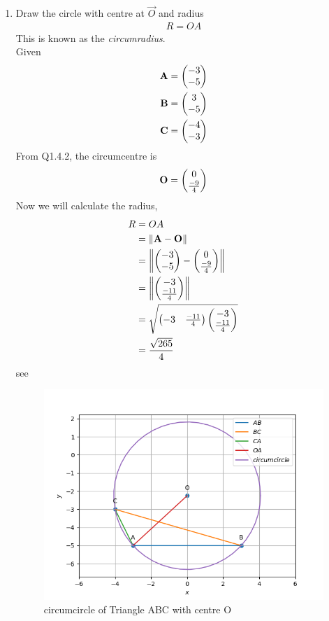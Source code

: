 \documentclass[11pt]{book}
\begin{document}
\begin{enumerate}[label=\thesection.\arabic*.,ref=\thesection.\theenumi]
\item Draw the circle with centre at $\vec{O}$ and radius 
\begin{align}
R = OA
\end{align}
This is known as the {\em circumradius}. \\
\solution
Given
\begin{align}
\mathbf{A} &= \begin{pmatrix}-3\\-5\end{pmatrix}\\
\mathbf{B} &= \begin{pmatrix}3\\-5\end{pmatrix}\\
\mathbf{C} &= \begin{pmatrix}-4\\-3\end{pmatrix}
\end{align}
From Q1.4.2, the circumcentre is
\begin{align}
\mathbf{O} = \begin{pmatrix}0\\ \frac{-9}{4}\end{pmatrix}
\end{align}
Now we will calculate the radius,
\begin{align}
      R &= OA\\
        &= \left\lVert\mathbf{A} - \mathbf{O}\right\rVert\\
        &= \left\lVert\begin{pmatrix}-3\\-5\end{pmatrix} - \begin{pmatrix}0\\ \frac{-9}{4}\end{pmatrix}\right\rVert\\
        &= \left\lVert\begin{pmatrix}-3\\ \frac{-11}{4}\end{pmatrix}\right\rVert\\
        &=\sqrt{\begin{pmatrix}-3 & \frac{-11}{4}\end{pmatrix}\begin{pmatrix}-3 \\ \frac{-11}{4}\end{pmatrix}} \\
        &= \frac{\sqrt{265}}{4}
\end{align}
see 
\begin{figure}[H]
\centering
\includegraphics[width=\columnwidth]{figs/perp_bisect5.png}
\caption{circumcircle of Triangle ABC with centre O}
\label{fig:circumcircle with centre O}	
\end{figure}


\end{enumerate}
\end{document}
